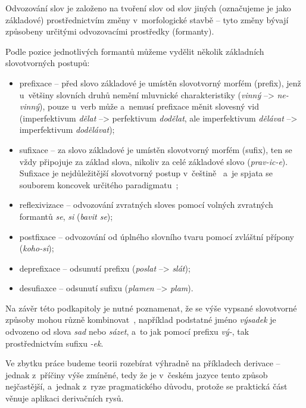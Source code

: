 Odvozování slov je založeno na tvoření slov od slov jiných (označujeme
je jako základové) prostřednictvím změny v~morfologické stavbě -- tyto
změny bývají způsobeny určitými odvozovacími prostředky (formanty).
\parencite[93]{dokulil00}

Podle pozice jednotlivých formantů můžeme vydělit několik základních
slovotvorných postupů:

\begin{itemize}
\tightlist
\item
  prefixace -- před slovo základové je umístěn slovotvorný morfém
  (prefix), jenž u~většiny slovních druhů nemění mluvnické
  charakteristiky (\emph{vinný} --\textgreater{} \emph{ne-vinný}), pouze
  u~verb může a~nemusí prefixace měnit slovesný vid (imperfektivum
  \emph{dělat} --\textgreater{} perfektivum \emph{dodělat}, ale
  imperfektivum \emph{dělávat} --\textgreater{} imperfektivum
  \emph{dodělávat});
\item
  sufixace -- za slovo základové je umístěn slovotvorný morfém (sufix),
  ten se vždy připojuje za základ slova, nikoliv za celé základové slovo
  (\emph{prav-ic-e}). Sufixace je nejdůležitější slovotvorný postup
v~češtině~\parencite[23]{dokulil62} a~je spjata se souborem koncovek
  určitého paradigmatu~\parencite[93]{dokulil00};
\item
  reflexivizace -- odvozování zvratných sloves pomocí volných zvratných
  formantů \emph{se}, \emph{si} (\emph{bavit se});
\item
  postfixace -- odvozování od úplného slovního tvaru pomocí zvláštní
  přípony (\emph{koho-si});
\item
  deprefixace -- odsunutí prefixu (\emph{poslat} --\textgreater{}
  \emph{slát});
\item
  desufiaxce -- odsunutí sufixu (\emph{plamen} --\textgreater{}
  \emph{plam}).~\parencite[93--94]{dokulil00}
\end{itemize}

Na závěr této podkapitoly je nutné poznamenat, že se výše vypsané
slovotvorné způsoby mohou různě kombinovat~\parencite[93]{dokulil00},
například podstatné jméno \emph{výsadek} je odvozeno od slova \emph{sad}
nebo \emph{sázet}, a~to jak pomocí prefixu \emph{vý-}, tak
prostřednictvím sufixu \emph{-ek}.

Ve zbytku práce budeme teorii rozebírat výhradně na příkladech derivace
-- jednak z~příčiny výše zmíněné, tedy že je v~českém jazyce tento
způsob nejčastější, a~jednak z~ryze pragmatického důvodu, protože se
praktická část věnuje aplikaci derivačních rysů.


